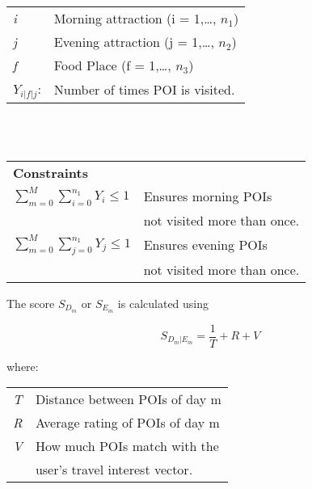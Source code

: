 \begin{tabular}{l l}

\textit{i} & Morning attraction (i = 1,…, $n_1$)\\
\textit{j} & Evening attraction (j = 1,…, $n_2$)\\
\textit{f} & Food Place (f = 1,…, $n_3$)\\
\textit{$Y_{i|f|j}$}: & Number of times POI is visited. \\
\end{tabular}
\\ 
\\
\begin{tabular}{l l}
\textbf{Constraints} & \\
\textit{$ \sum_{m=0}^{M}\sum_{i=0}^{n_1}{Y_i} \leq 1$} & Ensures morning POIs\\ & not visited more than once. \\

\textit{$ \sum_{m=0}^{M}\sum_{j=0}^{n_1}{Y_j} \leq 1$} & Ensures evening POIs\\ & not visited more than once.\\


\end{tabular}

The score $S_{D_m}$ or $S_{E_m}$ is calculated using

\[ S_{D_m | E_m} = \frac{1}{T} + R + V\]

where:
\\
\begin{tabular}{l l}
\textit{T} & Distance between POIs of day m\\ 
\textit{R} & Average rating of POIs of day m\\  
\textit{V} & How much POIs match with the \\ &  user's travel interest vector. \\  

\end{tabular}
\\

